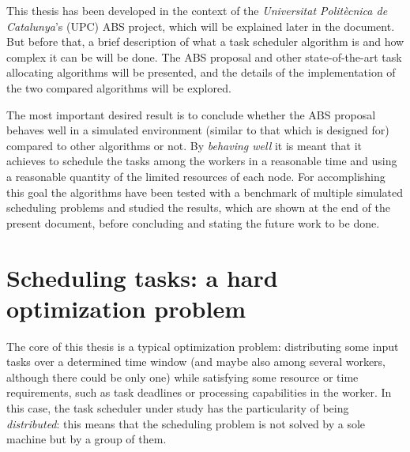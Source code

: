 This thesis has been developed in the context of the \emph{Universitat Polit\`ecnica de Catalunya}'s (UPC) ABS project, which will be explained later in the document. But before that, a brief description of what a task scheduler algorithm is and how complex it can be will be done. The ABS proposal and other state-of-the-art task allocating algorithms will be presented, and the details of the implementation of the two compared algorithms will be explored.

The most important desired result is to conclude whether the ABS proposal behaves well in a simulated environment (similar to that which is designed for) compared to other algorithms or not. By \emph{behaving well} it is meant that it achieves to schedule the tasks among the workers in a reasonable time and using a reasonable quantity of the limited resources of each node. For accomplishing this goal the algorithms have been tested with a benchmark of multiple simulated scheduling problems and studied the results, which are shown at the end of the present document, before concluding and stating the future work to be done.

\section{Scheduling tasks: a hard optimization problem}


The core of this thesis is a typical optimization problem: distributing some input tasks over a determined time window (and maybe also among several workers, although there could be only one) while satisfying some resource or time requirements, such as task deadlines or processing capabilities in the worker. In this case, the task scheduler under study has the particularity of being \emph{distributed}: this means that the scheduling problem is not solved by a sole machine but by a group of them.

